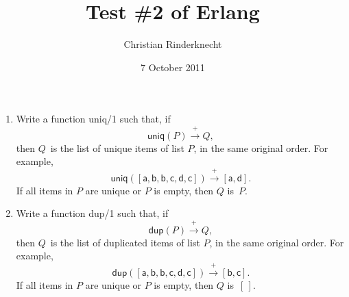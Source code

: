 \documentclass[11pt,a4paper]{article}
\title{Test \#2 of \textsf{Erlang}}
\author{Christian Rinderknecht}
\date{7 October 2011}
\newcommand\fun[1]{\textsf{#1}}
\begin{document}
\maketitle

\thispagestyle{empty}

\begin{enumerate}

  \item Write a function \fun{uniq/1} such that, if \[\fun{uniq}(P)
    \xrightarrow{+} Q,\] then \(Q\)~is the list of unique items of
    list \(P\), in the same original order. For example,
    \[\fun{uniq}([\fun{a},\fun{b},\fun{b},\fun{c},\fun{d},\fun{c}])
    \xrightarrow{+} [\fun{a},\fun{d}].\] If all items in \(P\) are
    unique or \(P\) is empty, then \(Q\) is~\(P\).

  \item Write a function \fun{dup/1} such that, if \[\fun{dup}(P)
    \xrightarrow{+} Q,\] then \(Q\)~is the list of duplicated items of
    list \(P\), in the same original order. For example,
    \[\fun{dup}([\fun{a},\fun{b},\fun{b},\fun{c},\fun{d},\fun{c}])
    \xrightarrow{+} [\fun{b},\fun{c}].\] If all items in \(P\) are
    unique or \(P\) is empty, then \(Q\) is~\([\,]\).

\end{enumerate}
\end{document}
